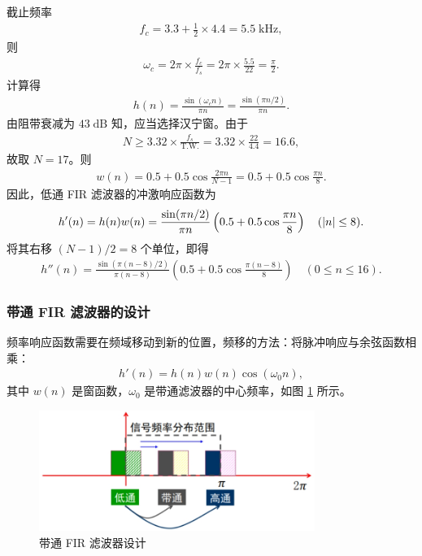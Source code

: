 \begin{solution}
    截止频率
    \begin{align*}
        f_c = 3.3 + \frac{1}{2} \times 4.4 = 5.5\;\mathrm{kHz},
    \end{align*}
    则
    \begin{align*}
        \omega_c = 2\pi \times \frac{f_c}{f_s} = 2\pi \times \frac{5.5}{22} = \frac{\pi}{2}.
    \end{align*}
    计算得
    \begin{align*}
        h(n) = \frac{\sin(\omega_c n)}{\pi n} = \frac{\sin(\pi n / 2)}{\pi n}.
    \end{align*}
    由阻带衰减为 $43\;\mathrm{dB}$ 知，应当选择汉宁窗。由于
    \begin{align*}
        N \ge 3.32 \times \frac{f_s}{\text{T.W.}} = 3.32 \times \frac{22}{4.4} = 16.6,
    \end{align*}
    故取 $N = 17$。则
    \begin{align*}
        w(n) = 0.5 + 0.5\cos\frac{2\pi n}{N - 1} = 0.5 + 0.5\cos\frac{\pi n}{8}.
    \end{align*}
    因此，低通 FIR 滤波器的冲激响应函数为
    \begin{align*}
        h'(n) = h(n) w(n) = \frac{\sin(\pi n / 2)}{\pi n} \left(0.5 + 0.5\cos\frac{\pi n}{8}\right) \quad (\left|n\right| \le 8).
    \end{align*}
    将其右移 $(N - 1) / 2 = 8$ 个单位，即得
    \begin{align*}
        h''(n) = \frac{\sin(\pi (n - 8) / 2)}{\pi (n - 8)} \left(0.5 + 0.5\cos\frac{\pi (n - 8)}{8}\right) \quad (0 \le n \le 16).
    \end{align*}
\end{solution}

\subsubsection{带通 FIR 滤波器的设计}

频率响应函数需要在频域移动到新的位置，频移的方法：将脉冲响应与余弦函数相乘：
\begin{align*}
    h'(n) = h(n)w(n)\cos(\omega_0 n),
\end{align*}
其中 $w(n)$ 是窗函数，$\omega_0$ 是带通滤波器的中心频率，如图 \ref{fig:band_pass_filter_fir} 所示。

\begin{figure}[H]
    \centering
    \includegraphics[width=0.8\textwidth]{chap4/img/band_pass_filter_fir.png}
    \caption{带通 FIR 滤波器设计}
    \label{fig:band_pass_filter_fir}
\end{figure}

